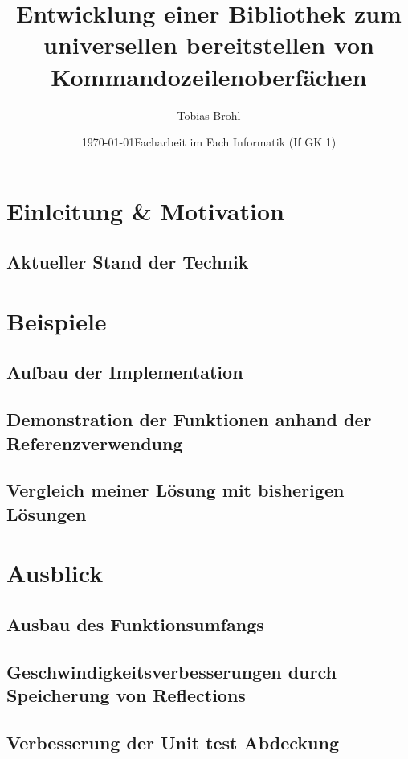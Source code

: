 \documentclass[a4paper,12pt,titlepage,ngerman]{article}
\title{Entwicklung einer Bibliothek zum universellen bereitstellen von Kommandozeilenoberfächen}
\author{Tobias Brohl}
\subtitle{}
\date{\today \linebreak \linebreak Facharbeit im Fach Informatik (If GK 1)}
\begin{document}
 \begin{sloppypar}
  \maketitle
  \setcounter{tocdepth}{5}
  \tableofcontents
  \pagebreak
  \section{Einleitung \& Motivation}\label{sec:Intro}
  \subsection{Aktueller Stand der Technik}\label{subsec:CurrentState}
  \section{Beispiele}\label{sec:Content}
  \subsection{Aufbau der Implementation}\label{subsec:Architecture}
  \subsection{Demonstration der Funktionen anhand der Referenzverwendung}\label{subsec:demonstration-der-bibliothek-durch-die-referenzverwendung}
  \subsection{Vergleich meiner Lösung mit bisherigen Lösungen}\label{subsec:Comparison}
  \section{Ausblick}\label{sec:Future}
  \subsection{Ausbau des Funktionsumfangs}\label{subsec:MoreFunctions}
  \subsection{Geschwindigkeitsverbesserungen durch Speicherung von Reflections}\label{subsec:StoringReflections}
  \subsection{Verbesserung der Unit test Abdeckung}\label{subsec:MoreUnitTests}

\end{sloppypar}
\end{document}
